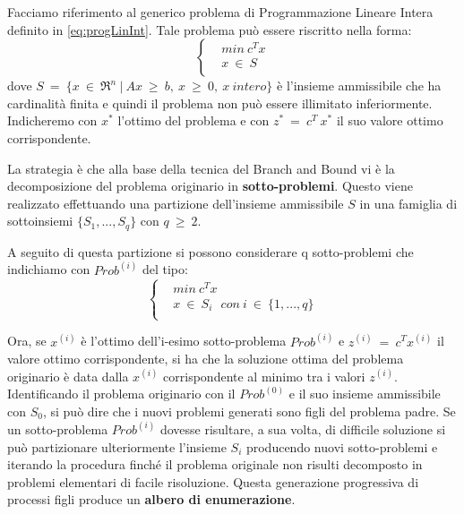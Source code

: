 Facciamo riferimento al generico problema di Programmazione Lineare Intera definito in \eqref{eq:progLinInt}. Tale problema può essere riscritto nella forma:
\begin{equation}
\label{eq:probLin2}
\begin{cases}
& min ~ c^T x \\
& x ~ \in ~ S \\
\end{cases}
\end{equation}
dove $S ~ = ~ \{x ~ \in ~ \Re^n ~ | ~ Ax ~ \geq ~ b, ~ x ~ \geq ~ 0, ~ x ~ intero\}$ è l'insieme ammissibile che ha cardinalità finita e quindi il problema non può essere illimitato inferiormente.
Indicheremo con $x^*$ l'ottimo del problema e con $z^* ~ = ~ c^T ~ x^*$ il suo valore ottimo corrispondente.

La strategia è che alla base della tecnica del Branch and Bound vi è la decomposizione del problema originario in \textbf{sotto-problemi}.
Questo viene realizzato effettuando una partizione dell'insieme ammissibile $S$ in una famiglia di sottoinsiemi $\{S_1,...,S_q\}$ con $q ~ \geq ~ 2$.

A seguito di questa partizione si possono considerare q sotto-problemi che indichiamo con $Prob^{(i)}$ del tipo: 
\begin{equation}
\label{eq:sottoProb}
\begin{cases}
& min ~ c^T x \\
& x ~ \in ~ S_i ~~~ con ~ i ~ \in ~ \{1,...,q\} \\
\end{cases}
\end{equation}

Ora, se $x^{(i)}$ è l'ottimo dell'i-esimo sotto-problema $Prob^{(i)}$ e $z^{(i)} ~ = ~ c^T x^{(i)}$ il valore ottimo corrispondente, si ha che la soluzione ottima del problema originario è data dalla $x^{(i)}$ corrispondente al minimo tra i valori $z^{(i)}$.
Identificando il problema originario con il $Prob^{(0)}$ e il suo insieme ammissibile con $S_0$, si può dire che i nuovi problemi generati sono figli del problema padre.
Se un sotto-problema $Prob^{(i)}$ dovesse risultare, a sua volta, di difficile soluzione si può partizionare ulteriormente l'insieme $S_i$ producendo nuovi sotto-problemi e iterando la procedura finché il problema originale non risulti decomposto in problemi elementari di facile risoluzione.
Questa generazione progressiva di processi figli produce un \textbf{albero di enumerazione}.\\

